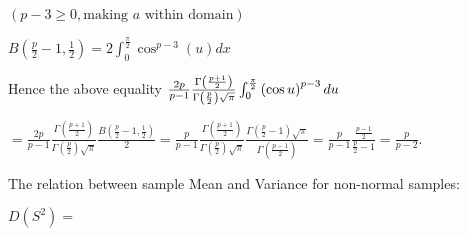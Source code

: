 \documentclass{article}
\begin{document}
$\left( p-3\geq 0,\text{making }a\text{ within domain}\right) $

$B\left( \frac{p}{2}-1,\frac{1}{2}\right) =2\int_{0}^{\frac{\pi }{2}}\cos
^{p-3}\left( u\right) dx$

Hence the above equality $\frac{2p}{p-1}\frac{\Gamma \left( \frac{p+1}{2}%
\right) }{\Gamma \left( \frac{p}{2}\right) \sqrt{\pi }}\int_{0}^{\frac{\pi }{%
2}}\left( \cos u\right) ^{p-3}du$

$=\frac{2p}{p-1}\frac{\Gamma \left( \frac{p+1}{2}\right) }{\Gamma \left( 
\frac{p}{2}\right) \sqrt{\pi }}\frac{B\left( \frac{p}{2}-1,\frac{1}{2}%
\right) }{2}=\frac{p}{p-1}\frac{\Gamma \left( \frac{p+1}{2}\right) }{\Gamma
\left( \frac{p}{2}\right) \sqrt{\pi }}\frac{\Gamma \left( \frac{p}{2}%
-1\right) \sqrt{\pi }}{\Gamma \left( \frac{p-1}{2}\right) }=\frac{p}{p-1}%
\frac{\frac{p-1}{2}}{\frac{p}{2}-1}=\frac{p}{p-2}.$

The relation between sample Mean and Variance for non-normal samples:

$D\left( S^{2}\right) =$
\end{document}
